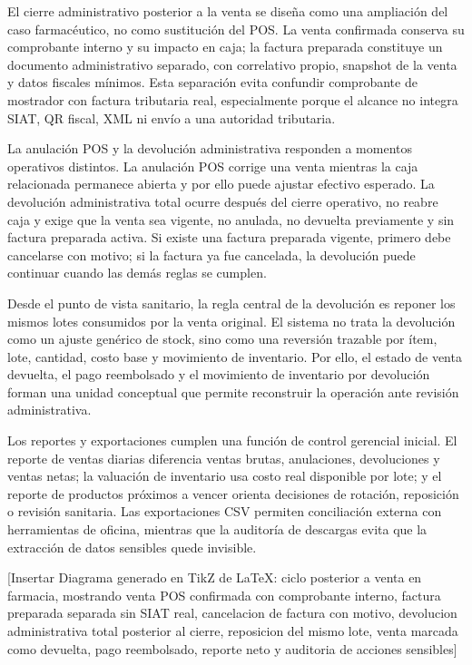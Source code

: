 El cierre administrativo posterior a la venta se diseña como una ampliación del caso farmacéutico, no como sustitución del POS. La venta confirmada conserva su comprobante interno y su impacto en caja; la factura preparada constituye un documento administrativo separado, con correlativo propio, snapshot de la venta y datos fiscales mínimos. Esta separación evita confundir comprobante de mostrador con factura tributaria real, especialmente porque el alcance no integra SIAT, QR fiscal, XML ni envío a una autoridad tributaria.

La anulación POS y la devolución administrativa responden a momentos operativos distintos. La anulación POS corrige una venta mientras la caja relacionada permanece abierta y por ello puede ajustar efectivo esperado. La devolución administrativa total ocurre después del cierre operativo, no reabre caja y exige que la venta sea vigente, no anulada, no devuelta previamente y sin factura preparada activa. Si existe una factura preparada vigente, primero debe cancelarse con motivo; si la factura ya fue cancelada, la devolución puede continuar cuando las demás reglas se cumplen.

Desde el punto de vista sanitario, la regla central de la devolución es reponer los mismos lotes consumidos por la venta original. El sistema no trata la devolución como un ajuste genérico de stock, sino como una reversión trazable por ítem, lote, cantidad, costo base y movimiento de inventario. Por ello, el estado de venta devuelta, el pago reembolsado y el movimiento de inventario por devolución forman una unidad conceptual que permite reconstruir la operación ante revisión administrativa.

Los reportes y exportaciones cumplen una función de control gerencial inicial. El reporte de ventas diarias diferencia ventas brutas, anulaciones, devoluciones y ventas netas; la valuación de inventario usa costo real disponible por lote; y el reporte de productos próximos a vencer orienta decisiones de rotación, reposición o revisión sanitaria. Las exportaciones CSV permiten conciliación externa con herramientas de oficina, mientras que la auditoría de descargas evita que la extracción de datos sensibles quede invisible.

[Insertar Diagrama generado en TikZ de LaTeX: ciclo posterior a venta en farmacia, mostrando venta POS confirmada con comprobante interno, factura preparada separada sin SIAT real, cancelacion de factura con motivo, devolucion administrativa total posterior al cierre, reposicion del mismo lote, venta marcada como devuelta, pago reembolsado, reporte neto y auditoria de acciones sensibles]


